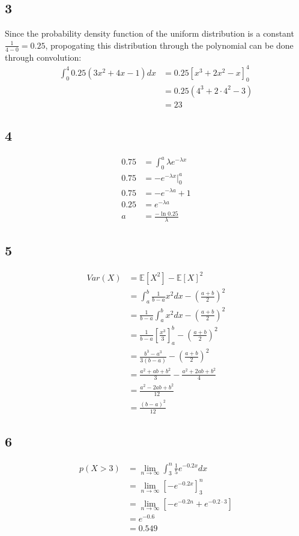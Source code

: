 \documentclass{article}
\begin{document}
\subsection*{3}
Since the probability density function of the uniform distribution is a constant
$\frac{1}{4-0} = 0.25$, propogating this distribution through the polynomial can
be done through convolution:
\begin{align*}
	\int_{0}^{4}0.25(3x^2 + 4x - 1)dx &= 0.25\left[x^3 + 2x^2 -x \right]^4_0\\
																		&= 0.25(4^3 + 2\cdot 4^2 - 3)\\
																		&= 23
\end{align*}


\subsection*{4}
\begin{align*}
	0.75 &= \int_0^a \lambda e ^{-\lambda x}\\
	0.75 &= -e ^{-\lambda x}\Big|_0^a\\
	0.75 &= -e^{-\lambda a} + 1\\
	0.25 &= e^{-\lambda a}\\
	a &= \frac{-\ln 0.25}{\lambda}
\end{align*}


\subsection*{5}
\begin{align*}
	Var(X) &= \mathbb{E}[X^2] - \mathbb{E}[X]^2\\
	&= \int_a^b \frac{1}{b-a}x^2 dx - (\frac{a+b}{2})^2\\
	&= \frac{1}{b-a} \int_a^bx^2 dx - (\frac{a+b}{2})^2\\
	&= \frac{1}{b-a}\left[\frac{x^3}{3}\right]_a^b - (\frac{a+b}{2})^2\\
	&= \frac{b^3 - a^3}{3(b-a)} - (\frac{a+b}{2})^2\\
	&= \frac{a^2 + ab + b^2}{3} - \frac{a^2 + 2ab + b^2}{4}\\
	&= \frac{a^2 - 2ab + b^2}{12}\\
	&= \frac{(b-a)^2}{12}
\end{align*}


\subsection*{6}
\begin{align*}
	p(X > 3) &= \lim_{n \to \infty} \int_3^n \frac{1}{5} e^{-0.2x} dx\\
	&= \lim_{n \to \infty} \left[-e^{-0.2x}\right]_3^n\\
	&= \lim_{n \to \infty}[-e^{-0.2n} + e^{-0.2 \cdot 3}]\\
	&= e^{-0.6}\\
	&= 0.549
\end{align*}
\end{document}
